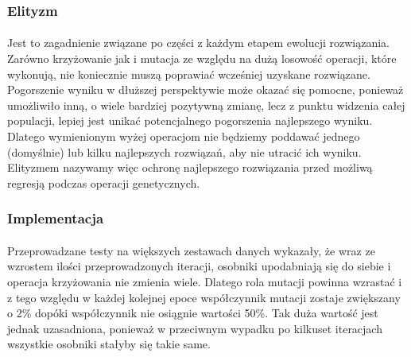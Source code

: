 \subsubsection{Elityzm}
\paragraph{}Jest to zagadnienie związane po części z każdym etapem ewolucji rozwiązania. Zarówno krzyżowanie jak i mutacja ze względu na dużą losowość operacji, które wykonują, nie koniecznie muszą poprawiać wcześniej uzyskane rozwiązane. Pogorszenie wyniku w dłuższej perspektywie może okazać się pomocne, ponieważ umożliwiło inną, o wiele bardziej pozytywną zmianę, lecz z punktu widzenia całej populacji, lepiej jest unikać potencjalnego pogorszenia najlepszego wyniku. Dlatego wymienionym wyżej operacjom nie będziemy poddawać jednego (domyślnie) lub kilku najlepszych rozwiązań, aby nie utracić ich wyniku. Elityzmem nazywamy więc ochronę najlepszego rozwiązania przed możliwą regresją podczas operacji genetycznych.
\subsubsection{Implementacja}
\paragraph{}Przeprowadzane testy na większych zestawach danych wykazały, że wraz ze wzrostem ilości przeprowadzonych iteracji, osobniki upodabniają się do siebie i operacja krzyżowania nie zmienia wiele. Dlatego rola mutacji powinna wzrastać i z tego względu w każdej kolejnej epoce współczynnik mutacji zostaje zwiększany o 2\% dopóki współczynnik nie osiągnie wartości 50\%. Tak duża wartość jest jednak uzasadniona, ponieważ w przeciwnym wypadku po kilkuset iteracjach wszystkie osobniki stałyby się takie same.
